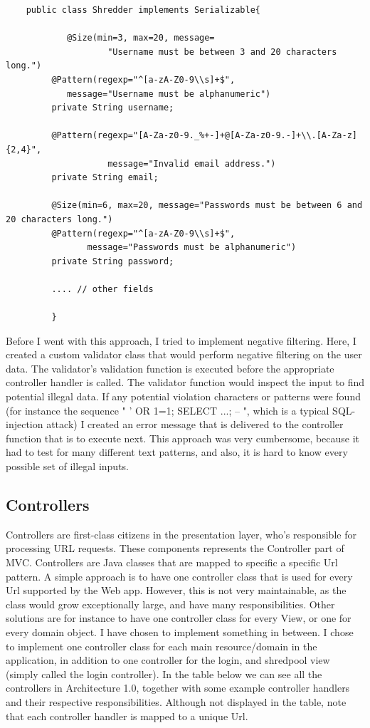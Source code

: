 \begin{lstlisting}
	public class Shredder implements Serializable{
		
	        @Size(min=3, max=20, message=
	    		    "Username must be between 3 and 20 characters long.")
	     @Pattern(regexp="^[a-zA-Z0-9\\s]+$",
	     	message="Username must be alphanumeric")
	     private String username;
	     
	     @Pattern(regexp="[A-Za-z0-9._%+-]+@[A-Za-z0-9.-]+\\.[A-Za-z]{2,4}",
	    	        message="Invalid email address.")
	     private String email;
	     
	     @Size(min=6, max=20, message="Passwords must be between 6 and 20 characters long.")
	     @Pattern(regexp="^[a-zA-Z0-9\\s]+$",
	 	        message="Passwords must be alphanumeric")
	     private String password;     
	    
	     .... // other fields
	     
	     }
\end{lstlisting}
Before I went with this approach, I tried to implement negative filtering. Here, I created a custom validator class that would perform negative filtering on the user data. The validator's validation function is executed before the appropriate controller handler is called. The validator function would inspect the input to find potential illegal data. If any potential violation characters or patterns were found (for instance the sequence " ' OR 1=1; SELECT ...; -- ", which is a typical SQL-injection attack) I created an error message that is delivered to the controller function that is to execute next. This approach was very cumbersome, because it had to test for many different text patterns, and also, it is hard to know every possible set of illegal inputs.


\subsection{Controllers}
Controllers are first-class citizens in the presentation layer, who's responsible for processing URL requests. These components represents the Controller part of MVC. Controllers are Java classes that are mapped to specific a specific Url pattern. A simple approach is to have one controller class that is used for every Url supported by the Web app. However, this is not very maintainable, as the class would  grow exceptionally large, and have many responsibilities. Other solutions are for instance to have one controller class for every View, or one for every domain object. I have chosen to implement something in between. I chose to implement one controller class for each main resource/domain in the application, in addition to one controller for the login, and shredpool view (simply called the login controller). In the table below we can see all the controllers in Architecture 1.0, together with some example controller handlers and their respective responsibilities. Although not displayed in the table, note that each controller handler is mapped to a unique Url.

